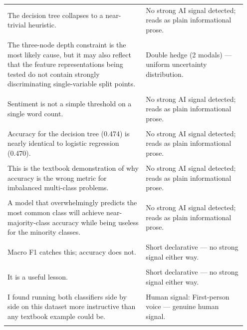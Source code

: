 \documentclass[11pt]{article}
\begin{document}
\begin{longtable}{|p{0.55\linewidth}|p{0.40\linewidth}|}
\hline
\rule{0pt}{3.5cm} & \\
\hline
The decision tree collapses to a near-trivial heuristic. & No strong AI signal detected; reads as plain informational prose. \\[2pt]
\hline
\rule{0pt}{3.5cm} & \\
\hline
The three-node depth constraint is the most likely cause, but it may also reflect that the feature representations being tested do not contain strongly discriminating single-variable split points. & Double hedge (2 modals) --- uniform uncertainty distribution. \\[2pt]
\hline
\rule{0pt}{3.5cm} & \\
\hline
Sentiment is not a simple threshold on a single word count. & No strong AI signal detected; reads as plain informational prose. \\[2pt]
\hline
\rule{0pt}{3.5cm} & \\
\hline
Accuracy for the decision tree (0.474) is nearly identical to logistic regression (0.470). & No strong AI signal detected; reads as plain informational prose. \\[2pt]
\hline
\rule{0pt}{3.5cm} & \\
\hline
This is the textbook demonstration of why accuracy is the wrong metric for imbalanced multi-class problems. & No strong AI signal detected; reads as plain informational prose. \\[2pt]
\hline
\rule{0pt}{3.5cm} & \\
\hline
A model that overwhelmingly predicts the most common class will achieve near-majority-class accuracy while being useless for the minority classes. & No strong AI signal detected; reads as plain informational prose. \\[2pt]
\hline
\rule{0pt}{3.5cm} & \\
\hline
Macro F1 catches this; accuracy does not. & Short declarative --- no strong signal either way. \\[2pt]
\hline
\rule{0pt}{3.5cm} & \\
\hline
It is a useful lesson. & Short declarative --- no strong signal either way. \\[2pt]
\hline
\rule{0pt}{3.5cm} & \\
\hline
I found running both classifiers side by side on this dataset more instructive than any textbook example could be. & Human signal: First-person voice --- genuine human signal. \\[2pt]
\hline
\rule{0pt}{3.5cm} & \\

\end{longtable}
\end{document}
